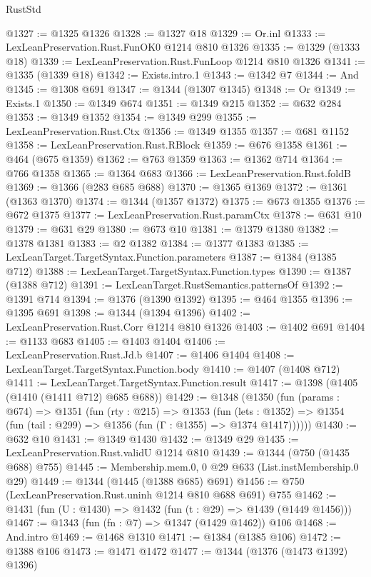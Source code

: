 \begin{lexlean}{RustStd}
\begin{coremodule}
@1327 := @1325 @1326
@1328 := @1327 @18
@1329 := Or.inl
@1333 := LexLeanPreservation.Rust.FunOK0 @1214 @810 @1326
@1335 := @1329 (@1333 @18)
@1339 := LexLeanPreservation.Rust.FunLoop @1214 @810 @1326
@1341 := @1335 (@1339 @18)
@1342 := Exists.intro.{1}
@1343 := @1342 @7
@1344 := And
@1345 := @1308 @691
@1347 := @1344 (@1307 @1345)
@1348 := Or
@1349 := Exists.{1}
@1350 := @1349 @674
@1351 := @1349 @215
@1352 := @632 @284
@1353 := @1349 @1352
@1354 := @1349 @299
@1355 := LexLeanPreservation.Rust.Ctx
@1356 := @1349 @1355
@1357 := @681 @1152
@1358 := LexLeanPreservation.Rust.RBlock
@1359 := @676 @1358
@1361 := @464 (@675 @1359)
@1362 := @763 @1359
@1363 := @1362 @714
@1364 := @766 @1358
@1365 := @1364 @683
@1366 := LexLeanPreservation.Rust.foldB
@1369 := @1366 (@283 @685 @688)
@1370 := @1365 @1369
@1372 := @1361 (@1363 @1370)
@1374 := @1344 (@1357 @1372)
@1375 := @673 @1355
@1376 := @672 @1375
@1377 := LexLeanPreservation.Rust.paramCtx
@1378 := @631 @10
@1379 := @631 @29
@1380 := @673 @10
@1381 := @1379 @1380
@1382 := @1378 @1381
@1383 := @2 @1382
@1384 := @1377 @1383
@1385 := LexLeanTarget.TargetSyntax.Function.parameters
@1387 := @1384 (@1385 @712)
@1388 := LexLeanTarget.TargetSyntax.Function.types
@1390 := @1387 (@1388 @712)
@1391 := LexLeanTarget.RustSemantics.patternsOf
@1392 := @1391 @714
@1394 := @1376 (@1390 @1392)
@1395 := @464 @1355
@1396 := @1395 @691
@1398 := @1344 (@1394 @1396)
@1402 := LexLeanPreservation.Rust.Corr @1214 @810 @1326
@1403 := @1402 @691
@1404 := @1133 @683
@1405 := @1403 @1404
@1406 := LexLeanPreservation.Rust.Jd.b
@1407 := @1406 @1404
@1408 := LexLeanTarget.TargetSyntax.Function.body
@1410 := @1407 (@1408 @712)
@1411 := LexLeanTarget.TargetSyntax.Function.result
@1417 := @1398 (@1405 (@1410 (@1411 @712) @685 @688))
@1429 := @1348
    (@1350
      (fun (params : @674) =>
      @1351
        (fun (rty : @215) =>
        @1353
          (fun (lets : @1352) =>
          @1354 (fun (tail : @299) => @1356 (fun (Γ : @1355) => @1374 @1417))))))
@1430 := @632 @10
@1431 := @1349 @1430
@1432 := @1349 @29
@1435 := LexLeanPreservation.Rust.validU @1214 @810
@1439 := @1344 (@750 (@1435 @688) @755)
@1445 := Membership.mem.{0, 0} @29 @633 (List.instMembership.{0} @29)
@1449 := @1344 (@1445 (@1388 @685) @691)
@1456 := @750 (LexLeanPreservation.Rust.uninh @1214 @810 @688 @691) @755
@1462 := @1431 (fun (U : @1430) => @1432 (fun (t : @29) => @1439 (@1449 @1456)))
@1467 := @1343 (fun (fn : @7) => @1347 (@1429 @1462)) @106
@1468 := And.intro
@1469 := @1468 @1310
@1471 := @1384 (@1385 @106)
@1472 := @1388 @106
@1473 := @1471 @1472
@1477 := @1344 (@1376 (@1473 @1392) @1396)

\end{coremodule}
\end{lexlean}
